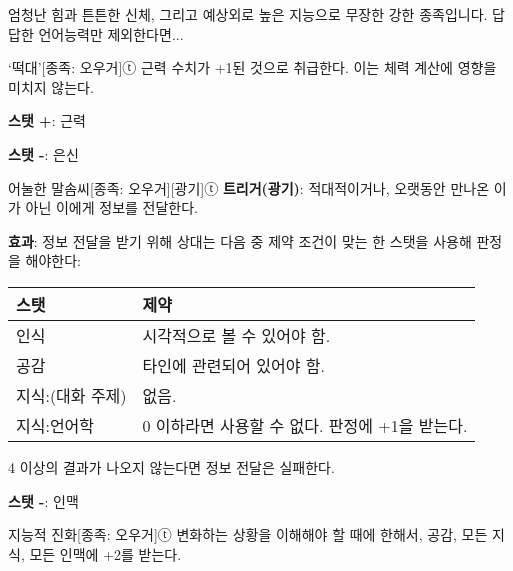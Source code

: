 \documentclass{report}
\begin{document}
	엄청난 힘과 튼튼한 신체, 그리고 예상외로 높은 지능으로 무장한 강한 종족입니다. 답답한 언어능력만 제외한다면...
	
	\begin{story}{`떡대'}{[종족: 오우거]ⓣ}
		근력 수치가 +1된 것으로 취급한다. 이는 체력 계산에 영향을 미치지 않는다.
		
		\textbf{스탯 +}: 근력
		
		\textbf{스탯 -}: 은신
		
	\end{story}
	
	\begin{story}{어눌한 말솜씨}{[종족: 오우거][광기]ⓣ}
		\textbf{트리거(광기)}: 적대적이거나, 오랫동안 만나온 이가 아닌 이에게 정보를 전달한다.
		
		\textbf{효과}: 정보 전달을 받기 위해 상대는 다음 중 제약 조건이 맞는 한 스탯을 사용해 판정을 해야한다:
		
		\begin{center}
		\begin{tabular}{l|l}
			\textbf{스탯}    & \textbf{제약}                                  \\\hline\hline
			인식             & 시각적으로 볼 수 있어야 함.                    \\\hline
			공감             & 타인에 관련되어 있어야 함.                     \\\hline
			지식:(대화 주제) & 없음.                                          \\\hline
			지식:언어학      & 0 이하라면 사용할 수 없다. 판정에 +1을 받는다.
		\end{tabular}
		\end{center}
		
		4 이상의 결과가 나오지 않는다면 정보 전달은 실패한다.
		
		\textbf{스탯 -}: 인맥
		
	\end{story}
	
	\begin{story}{지능적 진화}{[종족: 오우거]ⓣ}
		변화하는 상황을 이해해야 할 때에 한해서, 공감, 모든 지식, 모든 인맥에 +2를 받는다.
		
	\end{story}
\end{document}
